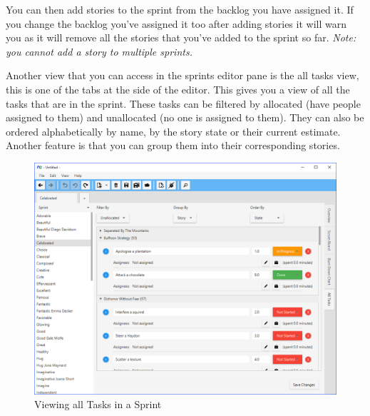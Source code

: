 You can then add stories to the sprint from the backlog you have assigned it. If you change the backlog you've assigned it too after adding stories it will warn you as it will remove all the stories that you've added to the sprint so far.\newline
\textit{Note: you cannot add a story to multiple sprints.}

Another view that you can access in the sprints editor pane is the all tasks view, this is one of the tabs at the side of the editor. This gives you a view of all the tasks that are in the sprint. These tasks can be filtered by allocated (have people assigned to them) and unallocated (no one is assigned to them). They can also be ordered alphabetically by name, by the story state or their current estimate. Another feature is that you can group them into their corresponding stories.

\begin{figure}[H]
\centering
\includegraphics[width=\textwidth]{images/screenshots/sprint2.PNG}
\caption{Viewing all Tasks in a Sprint}
\label{fig:new_project}
\end{figure}


